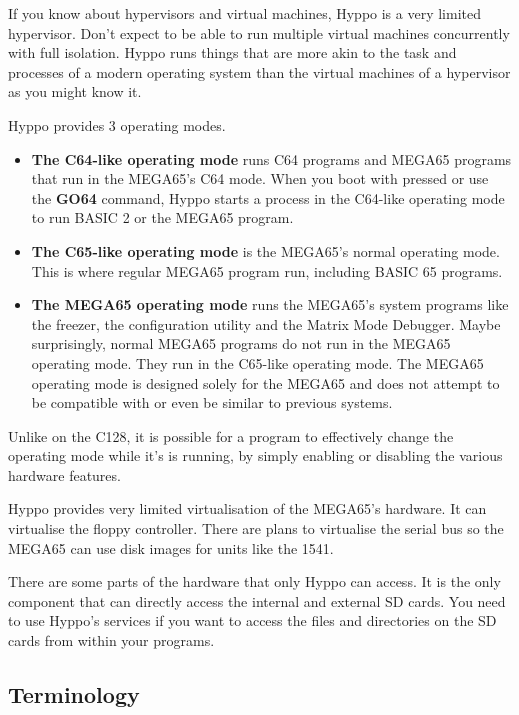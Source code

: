 If you know about hypervisors and virtual machines, Hyppo is a very limited
hypervisor. Don't expect to be able to run multiple virtual machines
concurrently with full isolation. Hyppo runs things that are more akin to the
task and processes of a modern operating system than the virtual machines of a
hypervisor as you might know it.

Hyppo provides 3 operating modes.

\begin{itemize}
  \item \textbf{The C64-like operating mode} runs C64 programs and MEGA65
        programs that run in the MEGA65's C64 mode. When you boot with
        \megasymbolkey pressed or use the \textbf{GO64} command, Hyppo
        starts a process in the C64-like operating mode to run BASIC 2 or the
        MEGA65 program.
  \item \textbf{The C65-like operating mode} is the MEGA65's normal operating
        mode. This is where regular MEGA65 program run, including BASIC 65
        programs.
  \item \textbf{The MEGA65 operating mode} runs the MEGA65's system programs
        like the freezer, the configuration utility and the Matrix Mode
        Debugger. Maybe surprisingly, normal MEGA65 programs do not run in the
        MEGA65 operating mode. They run in the C65-like operating mode. The
        MEGA65 operating mode is designed solely for the MEGA65 and does not
        attempt to be compatible with or even be similar to previous systems.
\end{itemize}

Unlike on the C128, it is possible for a program to effectively change the
operating mode while it's is running, by simply enabling or disabling the
various hardware features.

\filbreak
Hyppo provides very limited virtualisation of the MEGA65's hardware. It can
virtualise the floppy controller. There are plans to virtualise the serial bus
so the MEGA65 can use disk images for units like the 1541.

There are some parts of the hardware that only Hyppo can access. It is the only
component that can directly access the internal and external SD cards. You need
to use Hyppo's services if you want to access the files and directories on the
SD cards from within your programs.

\subsection{Terminology}

